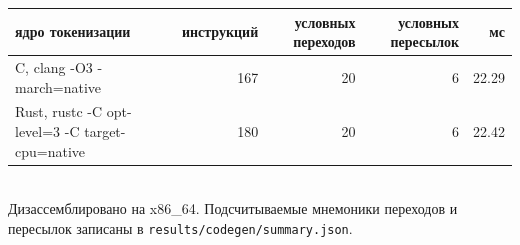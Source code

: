 \begin{tabular}{lrrrr}
\toprule
ядро токенизации & инструкций & условных переходов & условных пересылок & мс \\
\midrule
C, clang -O3 -march=native & 167 & 20 & 6 & 22.29 \\
Rust, rustc -C opt-level=3 -C target-cpu=native & 180 & 20 & 6 & 22.42 \\
\bottomrule
\end{tabular}
\\[2pt]{\footnotesize Дизассемблировано на x86\_64. Подсчитываемые мнемоники переходов и пересылок записаны в \texttt{results/codegen/summary.json}.}
